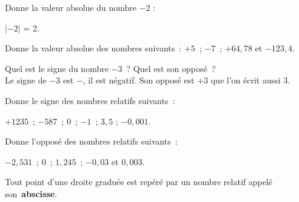\begin{methode*1}


\begin{exemple*1}
Donne la valeur absolue du nombre $-2$ :

$|-2|$ = 2.
\end{exemple*1}


\exercice
Donne la valeur absolue des nombres suivants : $+5$ ; $-7$ ; $+64,78$ et $-123,4$.

\end{methode*1}


\begin{methode*1}



\begin{exemple*1}
Quel est le signe du nombre $-3$ ? Quel est son opposé ? \\[1em]
Le signe de $- 3$ est $-$, il est négatif. Son opposé est $+ 3$ que l'on écrit aussi 3.
\end{exemple*1}

\exercice 
Donne le signe des nombres relatifs suivants :

$+1235$ ; $-587$ ; $0$ ; $-1$ ;  $3,5$ ; $-0,001$.

\exercice 
Donne l'opposé des nombres relatifs suivants :

$-2,531$ ; $0$ ; $1,245$ ;  $-0,03$ et $0,003$.

\end{methode*1}




\newpage


\begin{aconnaitre}
Tout point d'une droite graduée est repéré par un nombre relatif appelé son \textcolor{C2}{\textbf{abscisse}}.


\end{aconnaitre}

